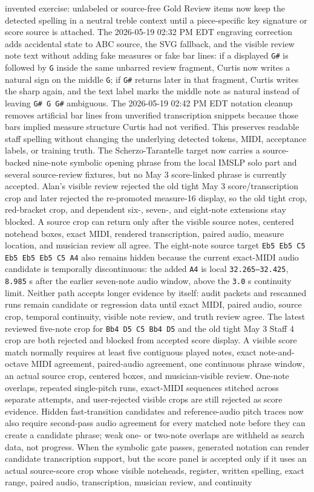 \documentclass[12pt,letterpaper]{article}
\begin{document}
invented exercise: unlabeled or source-free Gold Review items now keep the detected spelling in a neutral treble context until a piece-specific key signature or score source is attached. The 2026-05-19 02:32 PM EDT engraving correction adds accidental state to ABC source, the SVG fallback, and the visible review note text without adding fake measures or fake bar lines: if a displayed \texttt{G\#} is followed by \texttt{G} inside the same unbarred review fragment, Curtis now writes a natural sign on the middle \texttt{G}; if \texttt{G\#} returns later in that fragment, Curtis writes the sharp again, and the text label marks the middle note as natural instead of leaving \texttt{G\# G G\#} ambiguous. The 2026-05-19 02:42 PM EDT notation cleanup removes artificial bar lines from unverified transcription snippets because those bars implied measure structure Curtis had not verified. This preserves readable staff spelling without changing the underlying detected tokens, MIDI, acceptance labels, or training truth. The Scherzo-Tarantelle target now carries a source-backed nine-note symbolic opening phrase from the local IMSLP solo part and several source-review fixtures, but no May 3 score-linked phrase is currently accepted. Alan's visible review rejected the old tight May 3 score/transcription crop and later rejected the re-promoted measure-16 display, so the old tight crop, red-bracket crop, and dependent six-, seven-, and eight-note extensions stay blocked. A source crop can return only after the visible source notes, centered notehead boxes, exact MIDI, rendered transcription, paired audio, measure location, and musician review all agree. The eight-note source target \texttt{Eb5 Eb5 C5 Eb5 Eb5 Eb5 C5 A4} also remains hidden because the current exact-MIDI audio candidate is temporally discontinuous: the added \texttt{A4} is local \texttt{32.265--32.425}, \texttt{8.985} s after the earlier seven-note audio window, above the \texttt{3.0} s continuity limit. Neither path accepts longer evidence by itself: audit packets and rescanned runs remain candidate or regression data until exact MIDI, paired audio, source crop, temporal continuity, visible note review, and truth review agree. The latest reviewed five-note crop for \texttt{Bb4 D5 C5 Bb4 D5} and the old tight May 3 Staff 4 crop are both rejected and blocked from accepted score display. A visible score match normally requires at least five contiguous played notes, exact note-and-octave MIDI agreement, paired-audio agreement, one continuous phrase window, an actual source crop, centered boxes, and musician-visible review. One-note overlaps, repeated single-pitch runs, exact-MIDI sequences stitched across separate attempts, and user-rejected visible crops are still rejected as score evidence. Hidden fast-transition candidates and reference-audio pitch traces now also require second-pass audio agreement for every matched note before they can create a candidate phrase; weak one- or two-note overlaps are withheld as search data, not progress. When the symbolic gate passes, generated notation can render candidate transcription support, but the score panel is accepted only if it uses an actual source-score crop whose visible noteheads, register, written spelling, exact range, paired audio, transcription, musician review, and continuity 
\end{document}
